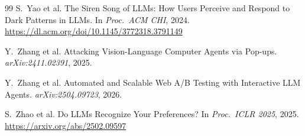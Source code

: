 \documentclass[11pt]{article}
\begin{document}
\begin{thebibliography}{99}
S.\ Yao et al.
\newblock The Siren Song of LLMs: How Users Perceive and Respond to Dark Patterns in LLMs.
\newblock In \textit{Proc.\ ACM CHI}, 2024.
\newblock \url{https://dl.acm.org/doi/10.1145/3772318.3791149}

Y.\ Zhang et al.
\newblock Attacking Vision-Language Computer Agents via Pop-ups.
\newblock \textit{arXiv:2411.02391}, 2025.

Y.\ Zhang et al.
\newblock Automated and Scalable Web A/B Testing with Interactive LLM Agents.
\newblock \textit{arXiv:2504.09723}, 2026.

S.\ Zhao et al.
\newblock Do LLMs Recognize Your Preferences?
\newblock In \textit{Proc.\ ICLR 2025}, 2025.
\newblock \url{https://arxiv.org/abs/2502.09597}

\end{thebibliography}
\end{document}
